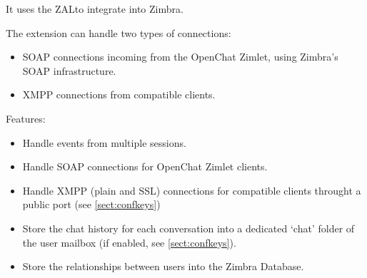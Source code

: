     It uses the ZAL\footnotemark[1] to integrate into Zimbra.

    The extension can handle two types of connections:
    \begin{itemize}
        \item SOAP connections incoming from the OpenChat Zimlet, using Zimbra's SOAP infrastructure.
        \item XMPP connections from compatible clients.
    \end{itemize}

    Features:
    \begin{itemize}
        \item Handle events from multiple sessions.
        \item Handle SOAP connections for OpenChat Zimlet clients.
        \item Handle XMPP (plain and SSL) connections for compatible clients throught a public port (see \autoref{sect:confkeys})
        \item Store the chat history for each conversation into a dedicated `chat' folder of the user mailbox (if enabled, see \autoref{sect:confkeys}).
        \item Store the relationships between users into the Zimbra Database.
    \end{itemize}

